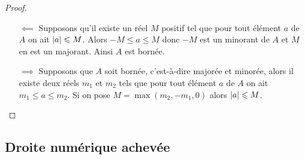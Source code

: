   \begin{proof}
    \begin{itemize}
      \item[\(\impliedby\)] Supposons qu'il existe un réel \(M\) positif tel que
        pour tout élément \(a\) de \(A\) on ait \(\left\lvert a\right\rvert\leqslant M\). Alors \(
        - M\leqslant a\leqslant M\) donc \( - M\) est un minorant de \(A\) et
        \(M\) en est un majorant. Ainsi \(A\) est bornée.
      \item[\(\implies\)] Supposons que \(A\) soit bornée, c'est-à-dire majorée
        et minorée, alors il existe deux réels \(m_1\) et \(m_2\) tels que pour
        tout élément \(a\) de \(A\) on ait \(m_1\leqslant a\leqslant m_2\). Si
        on pose \(M = \max(m_2, - m_1, 0)\) alors \(\left\lvert a\right\rvert\leqslant M\).
    \end{itemize}
  \end{proof}

  \subsection{Droite numérique achevée}

